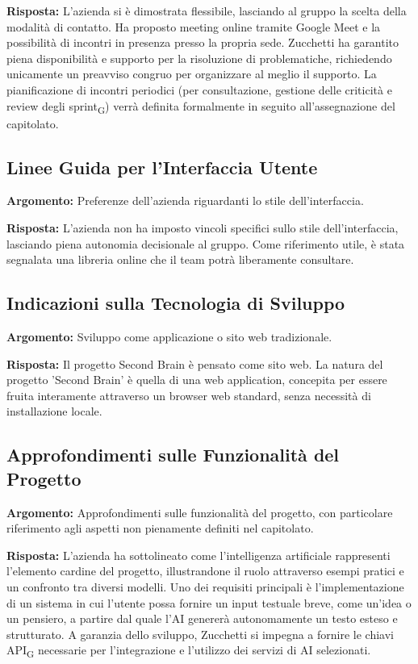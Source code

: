 \documentclass[11pt,a4paper]{article}
\newcommand{\gls}[1]{#1\textsubscript{G}}
\begin{document}
\textbf{Risposta:} L'azienda si è dimostrata flessibile, lasciando al gruppo la scelta della modalità di contatto. Ha proposto meeting online tramite Google Meet e la possibilità di incontri in presenza presso la propria sede. Zucchetti ha garantito piena disponibilità e supporto per la risoluzione di problematiche, richiedendo unicamente un preavviso congruo per organizzare al meglio il supporto. La pianificazione di incontri periodici (per consultazione, gestione delle criticità e review degli \gls{sprint}) verrà definita formalmente in seguito all'assegnazione del capitolato.

\subsection{Linee Guida per l'Interfaccia Utente}
\textbf{Argomento:} Preferenze dell'azienda riguardanti lo stile dell'interfaccia.

\textbf{Risposta:} L'azienda non ha imposto vincoli specifici sullo stile dell'interfaccia, lasciando piena autonomia decisionale al gruppo. Come riferimento utile, è stata segnalata una libreria online che il team potrà liberamente consultare.

\subsection{Indicazioni sulla Tecnologia di Sviluppo}
\textbf{Argomento:} Sviluppo come applicazione o sito web tradizionale.

\textbf{Risposta:} Il progetto Second Brain è pensato come sito web. La natura del progetto 'Second Brain' è quella di una web application, concepita per essere fruita interamente attraverso un browser web standard, senza necessità di installazione locale.

\subsection{Approfondimenti sulle Funzionalità del Progetto}
\textbf{Argomento:} Approfondimenti sulle funzionalità del progetto, con particolare riferimento agli aspetti non pienamente definiti nel capitolato.

\textbf{Risposta:} L'azienda ha sottolineato come l'intelligenza artificiale rappresenti l'elemento cardine del progetto, illustrandone il ruolo attraverso esempi pratici e un confronto tra diversi modelli. Uno dei requisiti principali è l'implementazione di un sistema in cui l'utente possa fornire un input testuale breve, come un'idea o un pensiero, a partire dal quale l'AI genererà autonomamente un testo esteso e strutturato. A garanzia dello sviluppo, Zucchetti si impegna a fornire le chiavi \gls{API} necessarie per l'integrazione e l'utilizzo dei servizi di AI selezionati.
\end{document}
